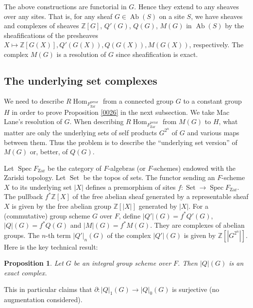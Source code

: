 \documentclass{amsart}
\newtheorem{Prop}[Thm]{Proposition}
\theoremstyle{remark}
\numberwithin{equation}{subsection}
\newcommand{\Z}{\mathbb{Z}}
\newcommand{\perar}{\mathrm{perar}}
\newcommand{\Zar}{\mathrm{Zar}}
\DeclareMathOperator{\Hom}{Hom}
\DeclareMathOperator{\Spec}{Spec}
\DeclareMathOperator{\Ab}{Ab}
\DeclareMathOperator{\Set}{Set}
\begin{document}
The above constructions are functorial in $G$.
Hence they extend to any sheaves over any sites.
That is, for any sheaf $G \in \Ab(S)$ on a site $S$,
we have sheaves and complexes of sheaves $\Z[G]$, $Q'(G)$, $Q(G)$, $M(G)$ in $\Ab(S)$
by the sheafifications of the presheaves $X \mapsto \Z[G(X)], Q'(G(X)), Q(G(X)), M(G(X))$, respectively.
The complex $M(G)$ is a resolution of $G$ since sheafification is exact.


\subsection{The underlying set complexes}
\label{0155}

We need to describe $R \Hom_{F^{\perar}_{\Zar}}$ from a connected group $G$ to a constant group $H$
in order to prove Proposition \ref{0026} in the next subsection.
We take Mac Lane's resolution of $G$.
When describing $R \Hom_{F^{\perar}_{\Zar}}$ from $M(G)$ to $H$,
what matter are only the underlying sets of self products $G^{2^{n}}$ of $G$
and various maps between them.
Thus the problem is to describe the ``underlying set version'' of $M(G)$
or, better, of $Q(G)$.

Let $\Spec F_{\Zar}$ be the category of $F$-algebras (or $F$-schemes)
endowed with the Zariski topology.
Let $\Set$ be the topos of sets.
The functor sending an $F$-scheme $X$ to its underlying set $|X|$
defines a premorphism of sites $f \colon \Set \to \Spec F_{\Zar}$.
The pullback $f^{\ast} \Z[X]$ of the free abelian sheaf generated by a representable sheaf $X$
is given by the free abelian group $\Z[|X|]$ generated by $|X|$.
For a (commutative) group scheme $G$ over $F$,
define $|Q'|(G) = f^{\ast} Q'(G)$, $|Q|(G) = f^{\ast} Q(G)$ and $|M|(G) = f^{\ast} M(G)$.
They are complexes of abelian groups.
The $n$-th term $|Q'|_{n}(G)$ of the complex $|Q'|(G)$ is given by $\Z[|G^{2^{n}}|]$.
Here is the key technical result:

\begin{Prop} \label{0020}
	Let $G$ be an integral group scheme over $F$.
	Then $|Q|(G)$ is an exact complex.
\end{Prop}

This in particular claims that
$\partial \colon |Q|_{1}(G) \to |Q|_{0}(G)$ is surjective
(no augmentation considered).
\end{document}
